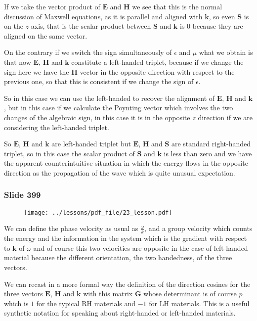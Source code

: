 \documentclass[../main/main.tex]{subfiles}
\begin{document}
If we take the vector product of $\mathbf{E}$ and $\mathbf{H}$ we see that this is the normal discussion of Maxwell equations, as it is parallel and aligned with $\mathbf{k}$, so even $\mathbf{S}$ is on the $z$ axis, that is the scalar product between $\mathbf{S}$ and $\mathbf{k}$ is 0 because they are aligned on the same vector.

On the contrary if we switch the sign simultaneously of $\epsilon$ and $\mu$ what we obtain is that now $\mathbf{E}$, $\mathbf{H}$ and $\mathbf{k}$ constitute a left-handed triplet, because if we change the sign here we have the $\mathbf{H}$ vector in the opposite direction with respect to the previous one, so that this is consistent if we change the sign of $\epsilon$. 

So in this case we can use the left-handed to recover the alignment of $\mathbf{E}$, $\mathbf{H}$ and $\mathbf{k}$, but in this case if we calculate the Poynting vector which involves the two changes of the algebraic sign, in this case it is in the opposite $z$ direction if we are considering the left-handed triplet.

So $\mathbf{E}$, $\mathbf{H}$ and $\mathbf{k}$ are left-handed triplet but $\mathbf{E}$, $\mathbf{H}$ and $\mathbf{S}$ are standard right-handed triplet, so in this case the scalar product of $\mathbf{S}$ and $\mathbf{k}$ is less than zero and we have the apparent counterintuitive situation in which the energy flows in the opposite direction as the propagation of the wave which is quite unusual expectation.

\newpage

\subsubsection{Slide 399}

\begin{figure}[h!]
\centering
\texttt{[image: ../lessons/pdf\_file/23\_lesson.pdf]}
\end{figure}

We can define the phase velocity as usual as $\frac{\omega}{k}$, and a group velocity which counts the energy and the information in the system which is the gradient with respect to $\mathbf{k}$ of $\omega$ and of course this two velocities are opposite in  the case of left-handed material because the different orientation, the two handedness, of the three vectors. 

We can recast in a more formal way the definition of the direction cosines for the three vectors $\mathbf{E}$, $\mathbf{H}$ and $\mathbf{k}$ with this matrix $\mathbf{G}$ whose determinant is of course $p$ which is $1$ for the typical RH materials and $-1$ for LH materials. This is a useful synthetic notation for speaking about right-handed or left-handed materials. 
\end{document}
